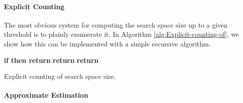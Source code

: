 \documentclass[a4paper,twocolumn]{article}
\newenvironment{lyxcode}
{\par\begin{list}{}{
\setlength{\rightmargin}{\leftmargin}
\setlength{\listparindent}{0pt}\raggedright
\setlength{\itemsep}{0pt}
\setlength{\parsep}{0pt}
\normalfont\ttfamily}\item[]}
{\end{list}}
\begin{document}
\paragraph*{Explicit Counting}

The most obvious system for computing the search space size up to
a given threshold is to plainly enumerate it. In Algorithm \ref{alg:Explicit-counting-of},
we show how this can be implemented with a simple recursive algorithm.

\begin{algorithm}
\begin{algorithmic}
\State {}
\State \textbf{if  then return }
\State 
\ForAll{}
\State 
\If{}
\State{}
\EndIf
\EndFor
\State \textbf{return} 
\EndFunction
\State
{} 
\State \textbf{return} 
\EndFunction
\end{algorithmic}

\textbf{}\begin{comment}
\begin{lyxcode}
\textbf{def}~space~size(state,~length,~threshold):

~~~~\textbf{if}~length~==~0:

~~~~~~~~\textbf{return}~1

~~~~s~=~0

~~~~\textbf{for}~c~\textbf{in}~chars:

~~~~~~~~p~=~\emph{nu}(state~+~c,~state)

~~~~~~~~\textbf{if}~p~>=~threshold:

~~~~~~~~~~~~s~+=~spacesize(state{[}1:{]}~+~c,

~~~~~~~~~~~~~~~~~~~~~~~~~~~length~-~1,

~~~~~~~~~~~~~~~~~~~~~~~~~~~threshold~{*}~p)

~~~~\textbf{return}~s
\end{lyxcode}

\end{comment}
{}

\caption{\label{alg:Explicit-counting-of}Explicit counting of search space
size.}



\end{algorithm}



\paragraph*{Approximate Estimation}
\end{document}
